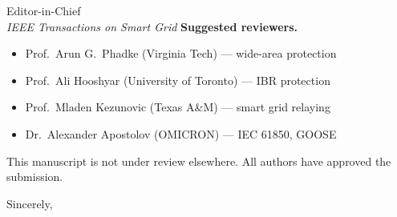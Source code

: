 \documentclass[11pt,a4paper]{letter}
\begin{document}
\begin{letter}{Editor-in-Chief\\
               \textit{IEEE Transactions on Smart Grid}}
\textbf{Suggested reviewers.}
\begin{itemize}
  \item Prof.\ Arun G.\ Phadke (Virginia Tech) --- wide-area protection
  \item Prof.\ Ali Hooshyar (University of Toronto) --- IBR protection
  \item Prof.\ Mladen Kezunovic (Texas A\&M) --- smart grid relaying
  \item Dr.\ Alexander Apostolov (OMICRON) --- IEC 61850, GOOSE
\end{itemize}

This manuscript is not under review elsewhere.
All authors have approved the submission.

\closing{Sincerely,}
\end{letter}
\end{document}
